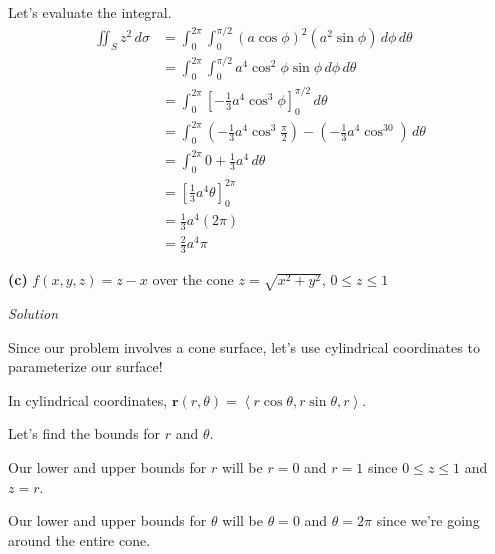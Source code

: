 \documentclass{article}
\newcommand{\lrp}[1]{\left( #1 \right)}
\newcommand{\lra}[1]{\left\langle #1 \right\rangle}
\newcommand{\lrb}[1]{\left[ #1 \right]}
\renewcommand{\r}[0]{\mathbf{r}}
\newcommand{\Solution}{\textit{Solution}}
\begin{document}
Let's evaluate the integral.
\begin{align*}
   \iint_S z^2\,d\sigma&= \int_0^{2\pi}\int_0^{\pi/2} \lrp{a\cos\phi}^2\lrp{a^2\sin\phi}\,d\phi\,d\theta\\
    &=\int_0^{2\pi}\int_0^{\pi/2} a^4\cos^2\phi\sin\phi\,d\phi\,d\theta\\
    &=\int_0^{2\pi}\lrb{-\frac{1}{3}a^4\cos^3\phi}_0^{\pi/2}\,d\theta\\
    &=\int_0^{2\pi}\lrp{-\frac{1}{3}a^4\cos^3\frac{\pi}{2}}-\lrp{-\frac{1}{3}a^4\cos^30}\,d\theta\\
    &=\int_0^{2\pi} 0+\frac{1}{3}a^4\,d\theta\\
    &=\lrb{\frac{1}{3}a^4\theta}_0^{2\pi}\\
    &=\frac{1}{3}a^4\lrp{2\pi}\\
    &=\boxed{\frac{2}{3}a^4\pi}
\end{align*}

{}\textbf{(c)} $f(x,y,z)=z-x$ over the cone $z=\sqrt{x^2+y^2}$, $0\leq z\leq 1$

\Solution

Since our problem involves a cone surface, let's use cylindrical coordinates to parameterize our surface!

In cylindrical coordinates, $\r(r,\theta)=\lra{r\cos\theta, r\sin\theta, r}$.

Let's find the bounds for $r$ and $\theta$.

Our lower and upper bounds for $r$ will be $r=0$ and $r=1$ since $0\leq z\leq 1$ and $z=r$.

Our lower and upper bounds for $\theta$ will be $\theta=0$ and $\theta=2\pi$ since we're going around the entire cone.
\end{document}
